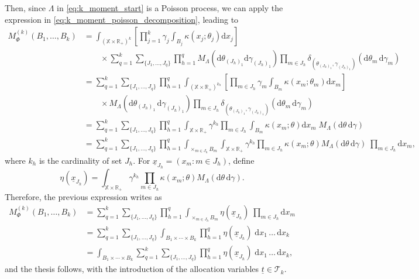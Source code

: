 \documentclass[11pt,a4paper,oneside]{article}
\newcommand{\calT}{\mathcal{T}}
\newcommand{\dd}{\mathrm d}
\newcommand{\X}{\mathbb{X}}
\newcommand{\R}{\mathbb{R}}
\theoremstyle{definition}
\theoremstyle{remark}
\begin{document}
Then, since $\Lambda$ in \eqref{eq:k_moment_start} is a Poisson process, we can apply the expression in \eqref{eq:k_moment_poisson_decomposition}, leading to
\begin{equation*}
    \begin{aligned}
        M^{(k)}_{\Phi}(B_1,\ldots,B_k) &= \int_{(\X\times\R_+)^k} \left[ \prod_{j=1}^k \gamma_j \int_{B_j} \kappa(x_j; \theta_j) \dd x_j\right] \\
        &\qquad \times \sum_{q=1}^k \sum_{\{J_1,\ldots,J_q\}} \prod_{h=1}^q M_{\Lambda}(\dd \theta_{(J_{h})_1} \dd \gamma_{(J_{h})_1}) \prod_{m \in J_h} \delta_{(\theta_{(J_{h})_1}, \gamma_{(J_{h})_1})}(\dd \theta_m \, \dd \gamma_m)\\
        &= \sum_{q=1}^k \sum_{\{J_1,\ldots,J_q\}} \prod_{h=1}^q \int_{(\X\times\R_+)^{k_h} } \left[ \prod_{m \in J_h} \gamma_{m} \int_{B_m} \kappa(x_m; \theta_m) \dd x_m\right] \\
        &\qquad \times M_{\Lambda}(\dd \theta_{(J_{h})_1}\, \dd \gamma_{(J_{h})_1}) \prod_{m \in J_h} \delta_{(\theta_{(J_{h})_1}, \gamma_{(J_{h})_1})}(\dd \theta_m \,\dd \gamma_m)\\
        &= \sum_{q=1}^k \sum_{\{J_1,\ldots,J_q\}} \prod_{h=1}^q \int_{\X\times\R_+ }  \gamma^{k_h} \prod_{m \in J_h} \int_{B_{m}} \kappa(x_m; \theta) \dd x_m \; M_{\Lambda}(\dd \theta\, \dd \gamma)\\
        &= \sum_{q=1}^k \sum_{\{J_1,\ldots,J_q\}} \prod_{h=1}^q \int_{\times_{m\in J_h} B_m} \int_{\X\times\R_+ }  \gamma^{k_h} \prod_{m \in J_h}  \kappa(x_m; \theta) M_{\Lambda}(\dd \theta\, \dd \gamma) \; \prod_{m \in J_h} \dd x_m,
    \end{aligned}
\end{equation*}
where $k_h$ is the cardinality of set $J_h$. For $\underline{x}_{J_h} = (x_m: m \in J_h)$, define 
\[
\eta(\underline{x}_{J_h}) = \int_{\X\times \R_+} \gamma^{k_h} \prod_{m \in J_h} \kappa(x_m; \theta) M_{\Lambda}(\dd\theta \, \dd \gamma).
\]
Therefore, the previous expression writes as
\begin{equation*}
\begin{aligned}
    M^{(k)}_{\Phi}(B_1,\ldots,B_k) &=  \sum_{q=1}^k \sum_{\{J_1,\ldots,J_q\}} \prod_{h=1}^q \int_{\times_{m\in J_h} B_m} \eta(\underline{x}_{J_h}) \; \prod_{m \in J_h} \dd x_m\\
    &= \sum_{q=1}^k \sum_{\{J_1,\ldots,J_q\}}  \int_{B_1 \times \cdots \times B_k} \prod_{h=1}^q \eta(\underline{x}_{J_h}) \; \dd x_1\,\ldots\, \dd x_{k}\\
    &= \int_{B_1 \times \cdots \times B_k} \sum_{q=1}^k \sum_{\{J_1,\ldots,J_q\}}   \prod_{h=1}^q \eta(\underline{x}_{J_h}) \; \dd x_1\,\ldots\, \dd x_{k},
\end{aligned}   
\end{equation*}
and the thesis follows, with the introduction of the allocation variables $\underline{t}\in \calT_k$.
\end{document}
